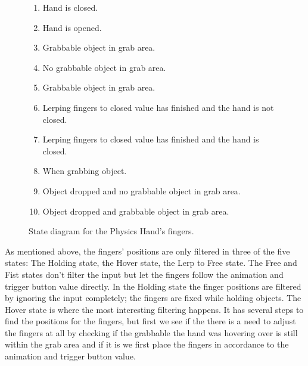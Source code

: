 
\begin{figure}[H]
\centering
{}
\begin{enumerate}[noitemsep]
\footnotesize
\item Hand is closed.
\item Hand is opened.
\item Grabbable object in grab area.
\item No grabbable object in grab area.
\item Grabbable object in grab area.
\item Lerping fingers to closed value has finished and the hand is not closed.
\item Lerping fingers to closed value has finished and the hand is closed.
\item When grabbing object.
\item Object dropped and no grabbable object in grab area.
\item Object dropped and grabbable object in grab area.
\end{enumerate}
\caption{State diagram for the Physics Hand's fingers.}
\label{fig:physicsHandStateDiagram}
\end{figure}

As mentioned above, the fingers' positions are only filtered in three of the five states: The Holding state, the Hover state, the Lerp to Free state. The Free and Fist states don't filter the input but let the fingers follow the animation and trigger button value directly. In the Holding state the finger positions are filtered by ignoring the input completely; the fingers are fixed while holding objects. The Hover state is where the most interesting filtering happens. It has several steps to find the positions for the fingers, but first we see if the there is a need to adjust the fingers at all by checking if the grabbable the hand was hovering over is still within the grab area and if it is we first place the fingers in accordance to the animation and trigger button value.


